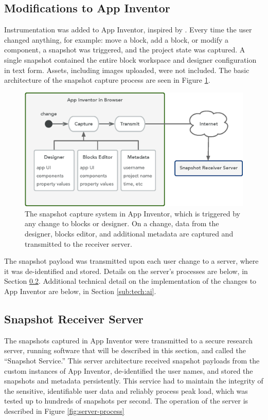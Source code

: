 \subsection{Modifications to App Inventor}
\label{sec:mod-ai}
Instrumentation was added to App Inventor, inspired by \citet{piech-2012}. Every time the user changed anything, for example: move a block, add a block, or modify a component, a snapshot was triggered, and the project state was captured. A single snapshot contained the entire block workspace and designer configuration in text form. Assets, including images uploaded, were not included. The basic architecture of the snapshot capture process are seen in Figure \ref{fig:snapshot-arch}.

\begin{figure}
  \centering
      \includegraphics[width=\textwidth]{diagrams/architecture}
  \caption[Snapshot capture design diagram]{The snapshot capture system in App Inventor, which is triggered by any change to blocks or designer. On a change, data from the designer, blocks editor, and additional metadata are captured and transmitted to the receiver server.}
  \label{fig:snapshot-arch}
\end{figure}

The snapshot payload was transmitted upon each user change to a server, where it was de-identified and stored. Details on the server's processes are below, in Section \ref{sec:server}. Additional technical detail on the implementation of the changes to App Inventor are below, in Section \ref{sub:tech:ai}.

\subsection{Snapshot Receiver Server}
\label{sec:server}
The snapshots captured in App Inventor were transmitted to a secure research server, running software that will be described in this section, and called the ``Snapshot Service.'' This server architecture received snapshot payloads from the custom instances of App Inventor, de-identified the user names, and stored the snapshots and metadata persistently. This service had to maintain the integrity of the sensitive, identifiable user data and reliably process peak load, which was tested up to hundreds of snapshots per second. The operation of the server is described in Figure \ref{fig:server-process}


